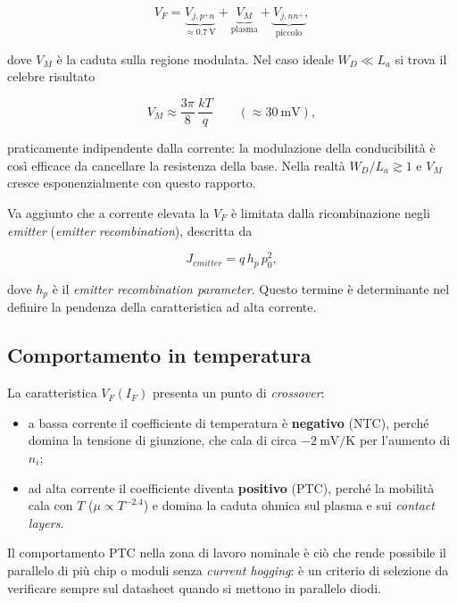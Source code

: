 \documentclass[11pt,a4paper]{article}
\begin{document}
\begin{equation}
V_F = \underbrace{V_{j,p^{+}n}}_{\approx \SI{0.7}{\volt}}
+ \underbrace{V_{M}}_{\text{plasma}}
+ \underbrace{V_{j,nn^{+}}}_{\text{piccolo}} ,
\end{equation}

dove $V_M$ è la caduta sulla regione modulata. Nel caso ideale
$W_D \ll L_a$ si trova il celebre risultato

\begin{equation}
V_{M} \approx \frac{3\pi}{8}\,\frac{kT}{q}
\qquad (\approx \SI{30}{\milli\volt}),
\end{equation}

praticamente indipendente dalla corrente: la modulazione della conducibilità è
così efficace da cancellare la resistenza della base. Nella realtà
$W_D / L_a \gtrsim 1$ e $V_M$ cresce esponenzialmente con questo rapporto.

Va aggiunto che a corrente elevata la $V_F$ è limitata dalla ricombinazione
negli \emph{emitter} (\emph{emitter recombination}), descritta da

\begin{equation}
J_{emitter} = q\, h_{p}\, p_{0}^{2},
\end{equation}

dove $h_p$ è il \emph{emitter recombination parameter}. Questo termine è
determinante nel definire la pendenza della caratteristica ad alta corrente.

\subsection{Comportamento in temperatura}

La caratteristica $V_F(I_F)$ presenta un punto di \emph{crossover}:

\begin{itemize}
\item a bassa corrente il coefficiente di temperatura è \textbf{negativo}
(NTC), perché domina la tensione di giunzione, che cala di circa
$-\SI{2}{\milli\volt\per\kelvin}$ per l'aumento di $n_i$;
\item ad alta corrente il coefficiente diventa \textbf{positivo} (PTC), perché
la mobilità cala con $T$ ($\mu \propto T^{-2.4}$) e domina la caduta ohmica sul
plasma e sui \emph{contact layers}.
\end{itemize}

Il comportamento PTC nella zona di lavoro nominale è ciò che rende possibile il
parallelo di più chip o moduli senza \emph{current hogging}: è un criterio di
selezione da verificare sempre sul datasheet quando si mettono in parallelo
diodi.
\end{document}
